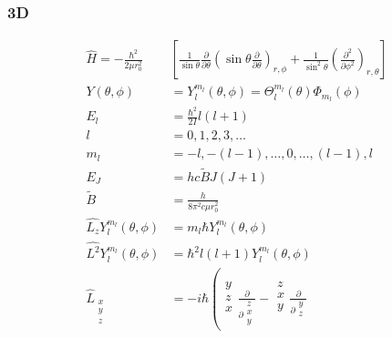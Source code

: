 \subsubsection{3D}
\begin{align*}
\hat{H}=-\frac{\hbar^2}{2\mu r_0^2}&\left[\frac{1}{\sin\theta}\frac{\partial}{\partial \theta}\left(\sin \theta \frac{\partial}{\partial \theta} \right)_{r,\phi} + \frac{1}{\sin^2\theta}\left(\frac{\partial^2}{\partial \phi^2} \right)_{r,\theta}\right]\\
Y\left(\theta,\phi\right)&=Y_l^{m_l}\left(\theta,\phi\right) = \Theta_l^{m_l}\left(\theta\right)\Phi_{m_l}\left(\phi\right)\\
E_l&=\frac{\hbar^2}{2I}l\left(l+1\right)\\
l&=0, 1, 2, 3, \ldots\\
m_l&=-l, -\left(l-1\right),\ldots,0,\ldots,\left(l-1\right),l\\
E_J&=hc\tilde{B}J\left(J+1\right)\\
\tilde{B}&=\frac{h}{8\pi^2c\mu r_0^2}\\
\hat{L_z}Y_l^{m_l}\left(\theta,\phi\right) &=m_l\hbar Y_l^{m_l}\left(\theta,\phi\right)\\
\hat{L^2}Y_l^{m_l}\left(\theta,\phi\right) &=\hbar^2l\left(l+1\right) Y_l^{m_l}\left(\theta,\phi\right)\\
\hat{L}_{\begin{smallmatrix}
	x\\
	y\\
	z\\
	\end{smallmatrix}}&=-i\hbar\left(\begin{smallmatrix}
	y\\
	z\\
	x\\
	\end{smallmatrix}\frac{\partial}{\partial \begin{smallmatrix}
	z\\
	x\\
	y\\
	\end{smallmatrix}}-\begin{smallmatrix}
	z\\
	x\\
	y\\
	\end{smallmatrix}\frac{\partial}{\partial \begin{smallmatrix}
	y\\
	z\\

\end{smallmatrix}}
\end{align*}
